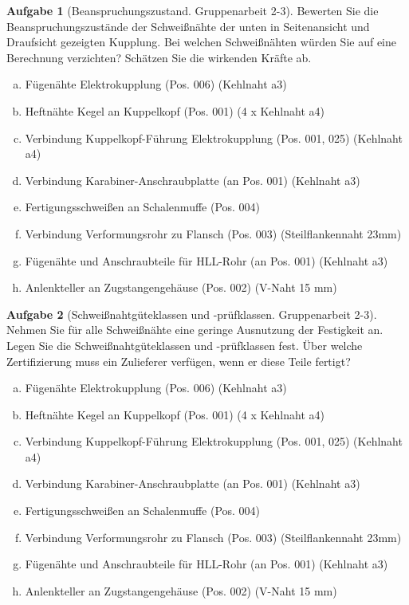 \documentclass[10pt,a4paper,headsepline,smallheadings]{scrartcl}
\theoremstyle{definition}
\newtheorem{aufgabe}{Aufgabe}
\begin{document}
\begin{aufgabe}[Beanspruchungszustand. Gruppenarbeit 2-3] 
Bewerten Sie die Beanspruchungszust\"ande der Schwei{\ss}n\"ahte der unten in Seitenansicht und Draufsicht gezeigten Kupplung. Bei welchen Schwei{\ss}n\"ahten w\"urden Sie auf eine Berechnung verzichten? Sch\"atzen Sie die wirkenden Kr\"afte ab.

\begin{enumerate}[a)]
\item F\"ugen\"ahte Elektrokupplung (Pos. 006) (Kehlnaht a3)
\item Heftn\"ahte Kegel an Kuppelkopf (Pos. 001) (4 x Kehlnaht a4)
\item Verbindung Kuppelkopf-F\"uhrung Elektrokupplung (Pos. 001, 025) (Kehlnaht a4)
\item Verbindung Karabiner-Anschraubplatte (an Pos. 001) (Kehlnaht a3)
\item Fertigungsschwei{\ss}en an Schalenmuffe (Pos. 004)
\item Verbindung Verformungsrohr zu Flansch (Pos. 003) (Steilflankennaht 23mm)
\item F\"ugen\"ahte und Anschraubteile f\"ur HLL-Rohr (an Pos. 001) (Kehlnaht a3)
\item Anlenkteller an Zugstangengeh\"ause (Pos. 002) (V-Naht 15 mm)
\end{enumerate}

\end{aufgabe}
\vspace{0.5cm}
\begin{aufgabe}[Schwei{\ss}nahtg\"uteklassen und -pr\"ufklassen. Gruppenarbeit 2-3] 
Nehmen Sie f\"ur alle Schwei{\ss}n\"ahte eine geringe Ausnutzung der Festigkeit an. Legen Sie die Schwei{\ss}nahtg\"uteklassen und -pr\"ufklassen fest. \"Uber welche Zertifizierung muss ein Zulieferer verf\"ugen, wenn er diese Teile fertigt?

\begin{enumerate}[a)]
\item F\"ugen\"ahte Elektrokupplung (Pos. 006) (Kehlnaht a3)
\item Heftn\"ahte Kegel an Kuppelkopf (Pos. 001) (4 x Kehlnaht a4)
\item Verbindung Kuppelkopf-F\"uhrung Elektrokupplung (Pos. 001, 025) (Kehlnaht a4)
\item Verbindung Karabiner-Anschraubplatte (an Pos. 001) (Kehlnaht a3)
\item Fertigungsschwei{\ss}en an Schalenmuffe (Pos. 004)
\item Verbindung Verformungsrohr zu Flansch (Pos. 003) (Steilflankennaht 23mm)
\item F\"ugen\"ahte und Anschraubteile f\"ur HLL-Rohr (an Pos. 001) (Kehlnaht a3)
\item Anlenkteller an Zugstangengeh\"ause (Pos. 002) (V-Naht 15 mm)
\end{enumerate}

\end{aufgabe}
\newpage
\end{document}
